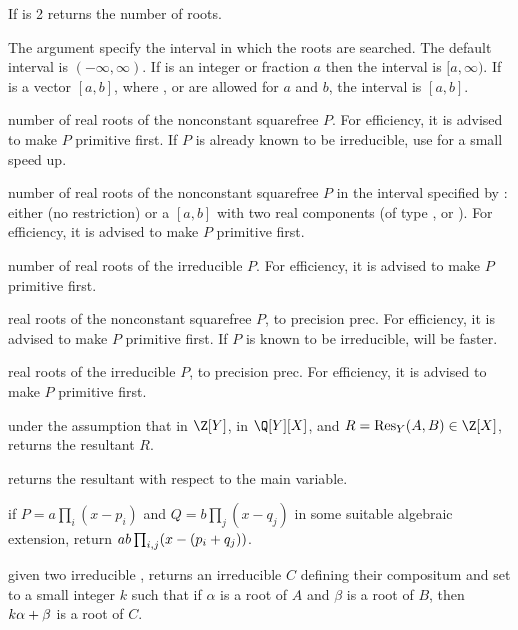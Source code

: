 \item If  is 2 returns the number of roots.

The argument  specify the interval in which the roots
are searched. The default interval is $(-\infty,\infty)$. If  is an
integer or fraction $a$ then the interval is $[a,\infty)$. If  is
a vector $[a,b]$, where ,  or  are allowed
for $a$ and $b$, the interval is $[a,b]$.

 number of real roots of the nonconstant
squarefree  $P$. For efficiency, it is advised to make $P$ primitive
first. If $P$ is already known to be irreducible, use 
for a small speed up.

 number of real roots of the
nonconstant squarefree  $P$ in the interval specified by :
either  (no restriction) or a  $[a,b]$ with two real
components (of type ,  or ). For efficiency,
it is advised to make $P$ primitive first.

 number of real roots of the irreducible
 $P$. For efficiency, it is advised to make $P$ primitive first.

 real roots of the nonconstant
squarefree  $P$, to precision prec. For efficiency, it is advised to
make $P$ primitive first. If $P$ is known to be irreducible,
 will be faster.

 real roots of the
irreducible  $P$, to precision prec. For efficiency, it is advised to
make $P$ primitive first.


under the assumption that  in $\Z[Y]$,  in $\Q[Y][X]$, and
$R = \text{Res}_Y(A, B) \in \Z[X]$, returns the resultant $R$.

 returns the resultant with respect
to the main variable.

 if
$P=a\prod_i(x-p_i)$ and $Q=b\prod_j(x-q_j)$ in some suitable algebraic
extension, return $a\*b\prod_{i,j}(x-(p_i+q_j))$.

given two irreducible , returns an irreducible  $C$ defining
their compositum and set  to a small integer $k$ such that if
$\alpha$ is a root of $A$ and $\beta$ is a root of $B$, then $k\*\alpha +
\beta$ is a root of $C$.

